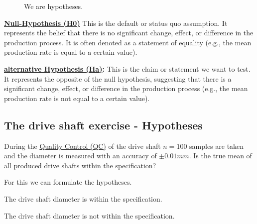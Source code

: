 \documentclass[
  a4paper,
]{scrbook}
\providecommand{\tightlist}{%
  \setlength{\itemsep}{0pt}\setlength{\parskip}{0pt}}\usepackage{longtable,booktabs,array}
\let\olddescription\description
\let\endolddescription\enddescription
\renewenvironment{description}{
          \begin{spacing}{1.5}\olddescription
        }{
          \endolddescription\end{spacing}
        }
\begin{document}
\begin{figure}[ht]


\caption{\label{fig-hypothesis}We are hypotheses.}

\end{figure}%

\textbf{\hyperref[acronyms_H0]{Null-Hypothesis (H0)}} This is the
default or status quo assumption. It represents the belief that there is
no significant change, effect, or difference in the production process.
It is often denoted as a statement of equality (e.g., the mean
production rate is equal to a certain value).

\textbf{\hyperref[acronyms_Ha]{alternative Hypothesis (Ha)}:} This is
the claim or statement we want to test. It represents the opposite of
the null hypothesis, suggesting that there is a significant change,
effect, or difference in the production process (e.g., the mean
production rate is not equal to a certain value).

\subsection{The drive shaft exercise -
Hypotheses}\label{the-drive-shaft-exercise---hypotheses-1}

During the \hyperref[acronyms_QC]{Quality Control (QC)} of the drive
shaft \(n=100\) samples are taken and the diameter is measured with an
accuracy of \(\pm 0.01mm\). Is the true mean of all produced drive
shafts within the specification?

For this we can formulate the hypotheses.

\begin{description}
\tightlist
\item[{\hyperref[acronyms_H0]{H0}}]
The drive shaft diameter is within the specification.
\item[{\hyperref[acronyms_Ha]{Ha}:}]
The drive shaft diameter is not within the specification.
\end{description}
\end{document}
